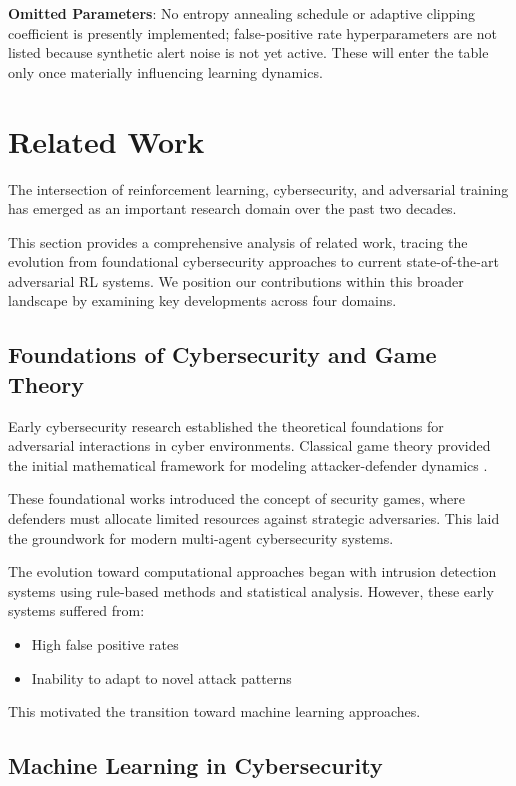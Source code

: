 \documentclass[12pt,oneside]{article}
\begin{document}
	\textbf{Omitted Parameters}: No entropy annealing schedule or adaptive clipping coefficient is presently implemented; false-positive rate hyperparameters are not listed because synthetic alert noise is not yet active. These will enter the table only once materially influencing learning dynamics.

\section{Related Work}

The intersection of reinforcement learning, cybersecurity, and adversarial training has emerged as an important research domain over the past two decades. 

This section provides a comprehensive analysis of related work, tracing the evolution from foundational cybersecurity approaches to current state-of-the-art adversarial RL systems. We position our contributions within this broader landscape by examining key developments across four domains.

\subsection{Foundations of Cybersecurity and Game Theory}

Early cybersecurity research established the theoretical foundations for adversarial interactions in cyber environments. Classical game theory provided the initial mathematical framework for modeling attacker-defender dynamics \citep{alpcan2010network}. 

These foundational works introduced the concept of security games, where defenders must allocate limited resources against strategic adversaries. This laid the groundwork for modern multi-agent cybersecurity systems.

The evolution toward computational approaches began with intrusion detection systems using rule-based methods and statistical analysis. However, these early systems suffered from:
\begin{itemize}
    \item High false positive rates
    \item Inability to adapt to novel attack patterns \citep{sommer2010outside}
\end{itemize}

This motivated the transition toward machine learning approaches.

\subsection{Machine Learning in Cybersecurity}
\end{document}

